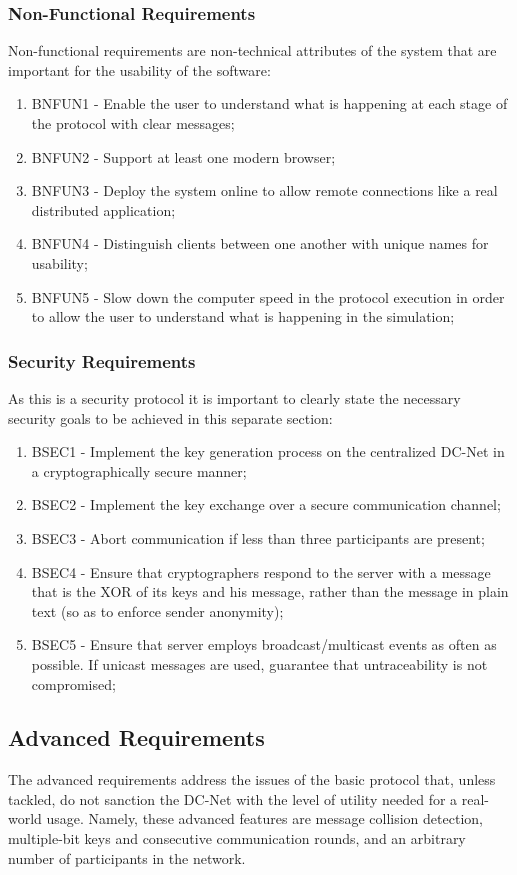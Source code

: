 \subsubsection{Non-Functional Requirements}
Non-functional requirements are non-technical attributes of the system that are important for the usability of the software: 
\begin{enumerate}
    \item BNFUN1 - Enable the user to understand what is happening at each stage of the protocol with clear messages;
    \item BNFUN2 - Support at least one modern browser;
    \item BNFUN3 - Deploy the system online to allow remote connections like a real distributed application;
    \item BNFUN4 - Distinguish clients between one another with unique names for usability;
    \item BNFUN5 - Slow down the computer speed in the protocol execution in order to allow the user to understand what is happening in the simulation;
\end{enumerate}

\subsubsection{Security Requirements}
As this is a security protocol it is important to clearly state the necessary security goals to be achieved in this separate section:
\begin{enumerate}
    \item BSEC1 - Implement the key generation process on the centralized DC-Net in a cryptographically secure manner;
    \item BSEC2 - Implement the key exchange over a secure communication channel;
    \item BSEC3 - Abort communication if less than three participants are present;
    \item BSEC4 - Ensure that cryptographers respond to the server with a message that is the XOR of its keys and his message, rather than the message in plain text (so as to enforce sender anonymity);
    \item BSEC5 - Ensure that server employs broadcast/multicast events as often as possible. If unicast messages are used, guarantee that untraceability is not compromised;
\end{enumerate}

\subsection{Advanced Requirements} \label{sec:advancedReq}
The advanced requirements address the issues of the basic protocol that, unless tackled, do not sanction the DC-Net with the level of utility needed for a real-world usage. Namely, these advanced features are message collision detection, multiple-bit keys and consecutive communication rounds, and an arbitrary number of participants in the network.


